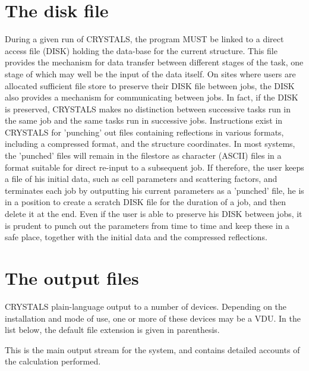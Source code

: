 \documentclass[10pt,a4paper]{report}
\begin{document}
\section{The disk file}


 


During a given run of CRYSTALS, the program MUST be linked to a 
 direct access file (DISK) holding the 
 data-base for the current structure. This file provides the mechanism
 for data transfer between different stages of the task, one stage of
 which may well be the input of the data itself. On sites where users
 are allocated sufficient file store to preserve their DISK file between
 jobs, the DISK also  provides a mechanism for communicating between
 jobs.
 In fact, if the DISK is preserved, CRYSTALS makes no distinction between
 successive tasks run in the same job and the same tasks
 run in successive jobs.
 Instructions exist in CRYSTALS for 'punching' out files containing reflections
 in various formats, including a compressed format, and the structure 
 coordinates.
 In most systems, the 'punched' files will remain in the filestore as character
 (ASCII) files  in a format suitable for direct re-input to a 
 subsequent job. If therefore, the user keeps a file of his initial data, such
 as cell parameters and scattering factors, and terminates each job by 
 outputting his current parameters as a 'punched' file, he is in a
 position to create a scratch DISK file for the 
 duration of a job, and then delete it at the end. Even if the user is able to
 preserve his DISK between jobs, it is prudent to punch out the parameters
 from time to time and keep these in a safe place, together with the initial
 data and the compressed reflections.
\section{The output files}


CRYSTALS plain-language output to a number of devices. Depending on the
 installation and mode of use, one or more of these devices may be a VDU.
 In the list below, the default file extension is given in parenthesis.


\bigskip{}




This is the main output stream for the system, and contains detailed
 accounts of the calculation performed.


\bigskip{}
\end{document}
